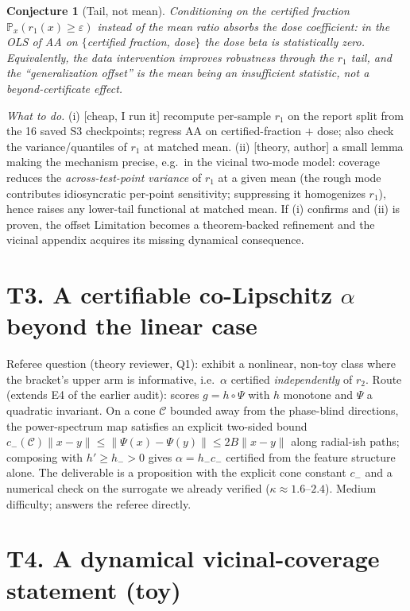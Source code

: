 \documentclass[11pt]{article}
\newtheorem{conjecture}{Conjecture}
\theoremstyle{definition}
\newcommand{\Prob}{\mathbb{P}}
\begin{document}
\begin{conjecture}[Tail, not mean]\label{conj:tail}
Conditioning on the certified fraction $\Prob_x(r_1(x)\ge\varepsilon)$ instead of the mean ratio
absorbs the dose coefficient: in the OLS of AA on $\{$certified fraction, dose$\}$ the dose beta is
statistically zero. Equivalently, the data intervention improves robustness \emph{through} the
$r_1$ tail, and the ``generalization offset'' is the mean being an insufficient statistic, not a
beyond-certificate effect.
\end{conjecture}
\noindent\emph{What to do.} (i) [cheap, I run it] recompute per-sample $r_1$ on the report split
from the 16 saved S3 checkpoints; regress AA on certified-fraction $+$ dose; also check the
variance/quantiles of $r_1$ at matched mean. (ii) [theory, author] a small lemma making the
mechanism precise, e.g.\ in the vicinal two-mode model: coverage reduces the \emph{across-test-point
variance} of $r_1$ at a given mean (the rough mode contributes idiosyncratic per-point sensitivity;
suppressing it homogenizes $r_1$), hence raises any lower-tail functional at matched mean. If
(i) confirms and (ii) is proven, the offset Limitation becomes a theorem-backed refinement and the
vicinal appendix acquires its missing dynamical consequence.

\section*{T3. A certifiable co-Lipschitz $\alpha$ beyond the linear case}

Referee question (theory reviewer, Q1): exhibit a nonlinear, non-toy class where the bracket's
upper arm is informative, i.e.\ $\alpha$ certified \emph{independently} of $r_2$.
Route (extends E4 of the earlier audit): scores $g=h\circ\Psi$ with $h$ monotone and $\Psi$ a
quadratic invariant. On a cone $\mathcal C$ bounded away from the phase-blind directions, the
power-spectrum map satisfies an explicit two-sided bound
$c_-(\mathcal C)\|x-y\|\le\|\Psi(x)-\Psi(y)\|\le 2B\|x-y\|$ along radial-ish paths; composing with
$h'\ge h_->0$ gives $\alpha=h_-c_-$ certified from the feature structure alone. The deliverable is
a proposition with the explicit cone constant $c_-$ and a numerical check on the surrogate we
already verified ($\kappa\approx1.6$--$2.4$). Medium difficulty; answers the referee directly.

\section*{T4. A dynamical vicinal-coverage statement (toy)}
\end{document}
